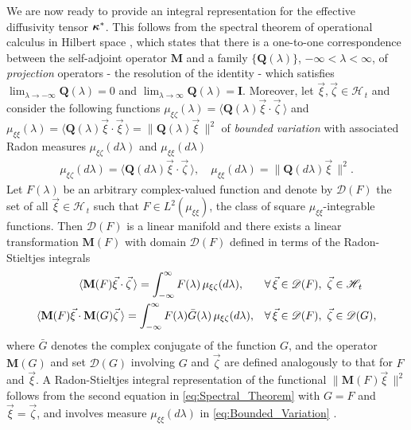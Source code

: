 \documentclass[11pt]{amsart}
\newcommand{\Mb}{\mathbf{M}}
\newcommand{\Ib}{\mathbf{I}}
\newcommand{\Qb}{\mathbf{Q}}
\newcommand{\Hs}{\mathscr{H}}
\newcommand\bkappa{\mbox{\boldmath${\kappa}$}}
\begin{document}
We are now ready to provide an integral representation
for the effective diffusivity tensor $\bkappa^*$. This follows from the
spectral theorem of operational calculus in Hilbert space
\cite{Reed-1980,Stone:64}, which states that there is a
one-to-one correspondence between the self-adjoint operator $\Mb$ and
a family $\{\Qb(\lambda)\}$, $-\infty<\lambda<\infty$, of \emph{projection} operators - the
resolution of the identity - which satisfies $\lim_{\lambda\to-\infty}\Qb(\lambda)=0$ and
$\lim_{\lambda\to\infty}\Qb(\lambda)=\Ib$. Moreover, let $\vec{\xi},\vec{\zeta}\in\Hs_{\,t}$ and
consider the following functions $\mu_{\xi\zeta}(\lambda)=\langle\Qb(\lambda)\vec{\xi}\cdot\vec{\zeta}\,\rangle$
and $\mu_{\xi\xi}(\lambda)=\langle\Qb(\lambda)\vec{\xi}\cdot\vec{\xi}\,\rangle=\|\Qb(\lambda)\vec{\xi}\,\|^2$ of 
\emph{bounded variation} with associated Radon
measures $\mu_{\xi\zeta}(d\lambda)$ and $\mu_{\xi\xi}(d\lambda)$ \cite{Stone:64}
%
\begin{align}\label{eq:Bounded_Variation}
  \mu_{\xi\zeta}(d\lambda)=\langle\Qb(d\lambda)\vec{\xi}\cdot\vec{\zeta}\,\rangle, \quad
  \mu_{\xi\xi}(d\lambda)=\|\Qb(d\lambda)\vec{\xi}\,\|^2.
\end{align}
%
Let $F(\lambda)$ be an arbitrary complex-valued function and denote by
$\mathscr{D}(F)$ the set of all $\vec{\xi}\in\Hs_{\,t}$ such that
$F\in L^2(\mu_{\xi\xi})$, the class of square $\mu_{\xi\xi}$-integrable
functions. Then $\mathscr{D}(F)$ is a linear manifold and there exists
a linear transformation $\Mb(F)$ with domain $\mathscr{D}(F)$ defined
in terms of the Radon-Stieltjes integrals \cite{Stone:64}
%
\begin{align}\label{eq:Spectral_Theorem}
  \langle\Mb(F)\vec{\xi}\cdot\vec{\zeta}\,\rangle=\int_{-\infty}^\infty F(\lambda)\,\mu_{\xi\zeta}(d\lambda), \qquad
  &\forall \, \vec{\xi}\in\mathscr{D}(F), \ \vec{\zeta}\in\Hs_{\,t}
  \\
  \langle\Mb(F)\vec{\xi}\cdot\Mb(G)\vec{\zeta}\,\rangle=\int_{-\infty}^\infty F(\lambda)\bar{G}(\lambda)\,\mu_{\xi\zeta }(d\lambda), \quad
  &\forall \, \vec{\xi}\in\mathscr{D}(F), \ \vec{\zeta}\in\mathscr{D}(G),
  \notag
\end{align}
%
where $\bar{G}$ denotes the complex conjugate of the function $G$, and
the operator $\Mb(G)$ and set $\mathscr{D}(G)$ involving $G$ and
$\vec{\zeta}$ are defined analogously to that for $F$ and $\vec{\xi}$. A
Radon-Stieltjes integral representation of the functional
$\|\Mb(F)\vec{\xi}\,\|^2$ follows from the second equation in
\eqref{eq:Spectral_Theorem} with $G=F$ and $\vec{\xi}=\vec{\zeta}$, and
involves measure $\mu_{\xi\xi}(d\lambda)$ in \eqref{eq:Bounded_Variation}
\cite{Stone:64}.    
\end{document}
